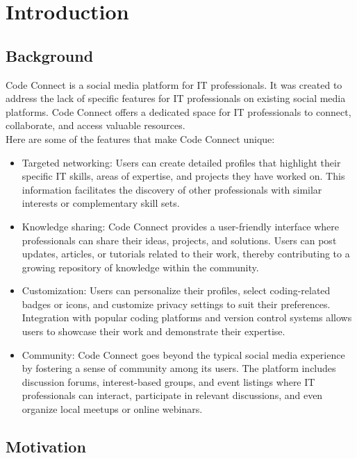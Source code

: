 \documentclass{article}
\begin{document}
\section{Introduction}

\subsection{Background}
Code Connect is a social media platform for IT professionals. It was created to address the lack of specific features for IT professionals on existing social media platforms. Code Connect offers a dedicated space for IT professionals to connect, collaborate, and access valuable resources.\\
Here are some of the features that make Code Connect unique:\\

\begin{itemize}
    \item Targeted networking: Users can create detailed profiles that highlight their specific IT skills, areas of expertise, and projects they have worked on. This information facilitates the discovery of other professionals with similar interests or complementary skill sets.
    \item Knowledge sharing: Code Connect provides a user-friendly interface where professionals can share their ideas, projects, and solutions. Users can post updates, articles, or tutorials related to their work, thereby contributing to a growing repository of knowledge within the community.
    \item Customization: Users can personalize their profiles, select coding-related badges or icons, and customize privacy settings to suit their preferences. Integration with popular coding platforms and version control systems allows users to showcase their work and demonstrate their expertise.
    \item Community: Code Connect goes beyond the typical social media experience by fostering a sense of community among its users. The platform includes discussion forums, interest-based groups, and event listings where IT professionals can interact, participate in relevant discussions, and even organize local meetups or online webinars.
\end{itemize}


\subsection{Motivation}
\end{document}
